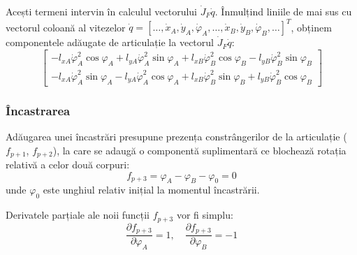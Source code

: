 \documentclass[12pt, a4paper]{article}
\begin{document}
Acești termeni intervin în calculul vectorului $\dot{J}_F \dot{q}$. Înmulțind liniile de mai sus cu vectorul coloană al vitezelor $\dot{q} = [\dots, \dot{x}_A, \dot{y}_A, \dot{\varphi}_A, \dots, \dot{x}_B, \dot{y}_B, \dot{\varphi}_B, \dots]^T$, obținem componentele adăugate de articulație la vectorul $\dot{J}_F \dot{q}$:
\begin{equation}
    \begin{bmatrix}
        -l_{xA}\dot{\varphi}_A^2\cos\varphi_A + l_{yA}\dot{\varphi}_A^2\sin\varphi_A + l_{xB}\dot{\varphi}_B^2\cos\varphi_B - l_{yB}\dot{\varphi}_B^2\sin\varphi_B \\
        -l_{xA}\dot{\varphi}_A^2\sin\varphi_A - l_{yA}\dot{\varphi}_A^2\cos\varphi_A + l_{xB}\dot{\varphi}_B^2\sin\varphi_B + l_{yB}\dot{\varphi}_B^2\cos\varphi_B
    \end{bmatrix}
\end{equation}

\subsubsection{Încastrarea}
Adăugarea unei încastrări presupune prezența constrângerilor de la articulație ($f_{p+1}$, $f_{p+2}$), la care se adaugă o componentă suplimentară ce blochează rotația relativă a celor două corpuri:
\begin{equation}
    f_{p+3} = \varphi_A - \varphi_B - \varphi_0 = 0
\end{equation}
unde $\varphi_0$ este unghiul relativ inițial la momentul încastrării.

Derivatele parțiale ale noii funcții $f_{p+3}$ vor fi simplu:
\begin{equation}
    \frac{\partial f_{p+3}}{\partial \varphi_A} = 1, \quad \frac{\partial f_{p+3}}{\partial \varphi_B} = -1
\end{equation}
\end{document}
